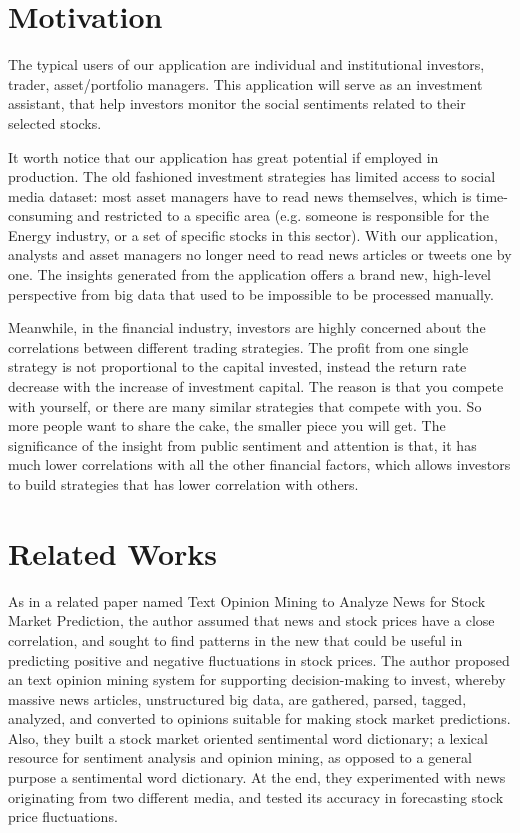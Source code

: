 \documentclass[conference]{IEEEtran}
\begin{document}
\section{Motivation}\label{Motivation}

The typical users of our application are individual and institutional investors, trader, asset/portfolio managers. This application will serve as an investment assistant, that help investors monitor the social sentiments related to their selected stocks. 

It worth notice that our application has great potential if employed in production. The old fashioned investment strategies has limited access to social media dataset: most asset managers have to read news themselves, which is time-consuming and restricted to a specific area (e.g. someone is responsible for the Energy industry, or a set of specific stocks in this sector). With our application, analysts and asset managers no longer need to read news articles or tweets one by one. The insights generated from the application offers a brand new, high-level perspective from big data that used to be impossible to be processed manually.

Meanwhile, in the financial industry, investors are highly concerned about the correlations between different trading strategies. The profit from one single strategy is not proportional to the capital invested, instead the return rate decrease with the increase of investment capital. The reason is that you compete with yourself, or there are many similar strategies that compete with you. So more people want to share the cake, the smaller piece you will get. The significance of the insight from public sentiment and attention is that, it has much lower correlations with all the other financial factors, which allows investors to build strategies that has lower correlation with others.
\vspace{1.0em}

\section{Related Works}\label{relatedworks}
As in a related paper named  Text Opinion Mining to Analyze News for Stock Market Prediction\cite{Kim}, the author assumed that news and stock prices have a close correlation, and sought to find patterns in the new that could be useful in predicting positive and negative fluctuations in stock prices. The author proposed an text opinion mining system for supporting decision-making to invest, whereby massive news articles, unstructured big data, are gathered, parsed, tagged, analyzed, and converted to opinions suitable for making stock market predictions. Also, they built a stock market oriented sentimental word dictionary; a lexical resource for sentiment analysis and opinion mining, as opposed to a general purpose a sentimental word dictionary. At the end, they experimented with news originating from two different media, and tested its accuracy in forecasting stock price fluctuations.
\end{document}
